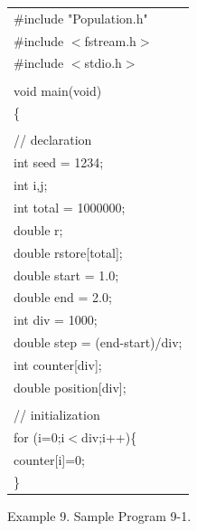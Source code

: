 {\footnotesize
\begin{center}
\begin{tabular}{|l|}\hline
\#include "Population.h"\\
\#include $<$fstream.h$>$\\
\#include $<$stdio.h$>$\\
\hspace*{\textwidth}\\
void main(void)\\
\{\\
\\
\hspace*{10mm}// declaration\\
\hspace*{10mm}int seed      = 1234;\\
\hspace*{10mm}int i,j;\\
\hspace*{10mm}int total     = 1000000;\\
\hspace*{10mm}double r;\\
\hspace*{10mm}double rstore[total];\\
\hspace*{10mm}double start  = 1.0;\\
\hspace*{10mm}double end    = 2.0;\\
\hspace*{10mm}int div       = 1000;\\
\hspace*{10mm}double step   = (end-start)/div;\\
\hspace*{10mm}int counter[div];\\
\hspace*{10mm}double position[div];\\
\\
\hspace*{10mm}// initialization\\
\hspace*{10mm}for (i=0;i$<$div;i++)\{\\
\hspace*{20mm}counter[i]=0;\\
\hspace*{10mm}\}\\\hline
\end{tabular}
\vspace*{5mm}

{\small
Example 9. Sample Program 9-1.
}
\end{center}
}  

